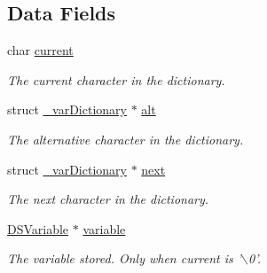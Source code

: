\subsection*{Data Fields}
\begin{DoxyCompactItemize}
\item 
\hypertarget{struct__var_dictionary_a6044b553e445970269cef9b91569d09d}{
char \hyperlink{struct__var_dictionary_a6044b553e445970269cef9b91569d09d}{current}}
\label{struct__var_dictionary_a6044b553e445970269cef9b91569d09d}

\begin{DoxyCompactList}\small\item\em The current character in the dictionary. \item\end{DoxyCompactList}\item 
\hypertarget{struct__var_dictionary_a916375645732b28192e23ad0745d00ca}{
struct \hyperlink{struct__var_dictionary}{\_\-varDictionary} $\ast$ \hyperlink{struct__var_dictionary_a916375645732b28192e23ad0745d00ca}{alt}}
\label{struct__var_dictionary_a916375645732b28192e23ad0745d00ca}

\begin{DoxyCompactList}\small\item\em The alternative character in the dictionary. \item\end{DoxyCompactList}\item 
\hypertarget{struct__var_dictionary_a3fab7f59fc3c8c7babba590499c69f63}{
struct \hyperlink{struct__var_dictionary}{\_\-varDictionary} $\ast$ \hyperlink{struct__var_dictionary_a3fab7f59fc3c8c7babba590499c69f63}{next}}
\label{struct__var_dictionary_a3fab7f59fc3c8c7babba590499c69f63}

\begin{DoxyCompactList}\small\item\em The next character in the dictionary. \item\end{DoxyCompactList}\item 
\hypertarget{struct__var_dictionary_a09be400084754591a8f182e4a2c83304}{
\hyperlink{struct_d_s_variable}{DSVariable} $\ast$ \hyperlink{struct__var_dictionary_a09be400084754591a8f182e4a2c83304}{variable}}
\label{struct__var_dictionary_a09be400084754591a8f182e4a2c83304}

\begin{DoxyCompactList}\small\item\em The variable stored. Only when current is '$\backslash$0'. \item\end{DoxyCompactList}\end{DoxyCompactItemize}


